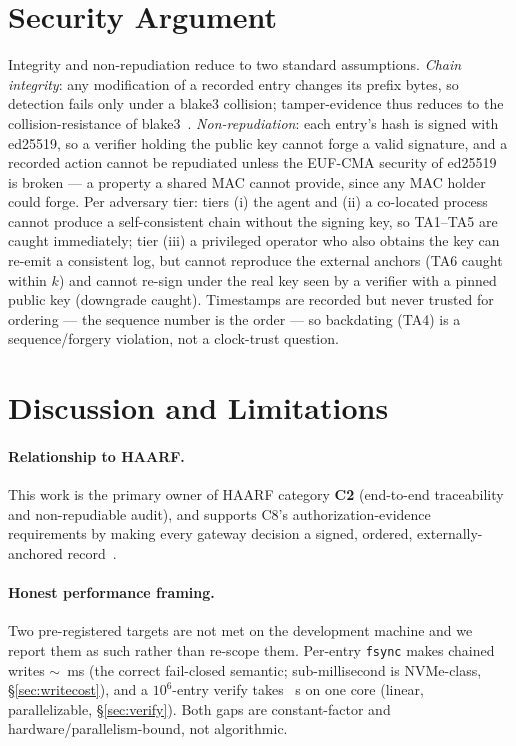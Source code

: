 \documentclass[11pt]{article}
\begin{document}
\section{Security Argument}\label{sec:security}
Integrity and non-repudiation reduce to two standard assumptions. \emph{Chain
integrity}: any modification of a recorded entry changes its prefix bytes, so
detection fails only under a blake3 collision; tamper-evidence thus reduces to the
collision-resistance of blake3~\cite{blake3}. \emph{Non-repudiation}: each entry's
hash is signed with ed25519, so a verifier holding the public key cannot forge a
valid signature, and a recorded action cannot be repudiated unless the EUF-CMA
security of ed25519~\cite{ed25519} is broken --- a property a shared MAC cannot
provide, since any MAC holder could forge. Per adversary tier: tiers (i) the agent
and (ii) a co-located process cannot produce a self-consistent chain without the
signing key, so TA1--TA5 are caught immediately; tier (iii) a privileged operator
who also obtains the key can re-emit a consistent log, but cannot reproduce the
external anchors (TA6 caught within $k$) and cannot re-sign under the real key seen
by a verifier with a pinned public key (downgrade caught). Timestamps are recorded
but never trusted for ordering --- the sequence number is the order --- so
backdating (TA4) is a sequence/forgery violation, not a clock-trust question.

\section{Discussion and Limitations}\label{sec:limitations}
\paragraph{Relationship to HAARF.} This work is the primary owner of HAARF category
\textbf{C2} (end-to-end traceability and non-repudiable audit), and supports C8's
authorization-evidence requirements by making every gateway decision a signed,
ordered, externally-anchored record~\cite{schwoebel2026haarf}.

\paragraph{Honest performance framing.} Two pre-registered targets are not met on
the development machine and we report them as such rather than re-scope them.
Per-entry \texttt{fsync} makes chained writes $\sim$\ChainedSignedMs~ms (the correct
fail-closed semantic; sub-millisecond is NVMe-class, \S\ref{sec:writecost}), and a
$10^6$-entry verify takes \VerifyOneM~s on one core (linear, parallelizable,
\S\ref{sec:verify}). Both gaps are constant-factor and hardware/parallelism-bound,
not algorithmic.
\end{document}
